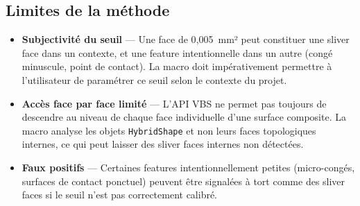 \subsection{Limites de la méthode}

\begin{itemize}
    \item[•] \textbf{Subjectivité du seuil} --- Une face de 0{,}005~mm² peut constituer une sliver face dans un contexte, et une feature intentionnelle dans un autre (congé minuscule, point de contact). La macro doit impérativement permettre à l'utilisateur de paramétrer ce seuil selon le contexte du projet.
    \item[•] \textbf{Accès face par face limité} --- L'API VBS ne permet pas toujours de descendre au niveau de chaque face individuelle d'une surface composite. La macro analyse les objets \texttt{HybridShape} et non leurs faces topologiques internes, ce qui peut laisser des sliver faces internes non détectées.
    \item[•] \textbf{Faux positifs} --- Certaines features intentionnellement petites (micro-congés, surfaces de contact ponctuel) peuvent être signalées à tort comme des sliver faces si le seuil n'est pas correctement calibré.
\end{itemize}


